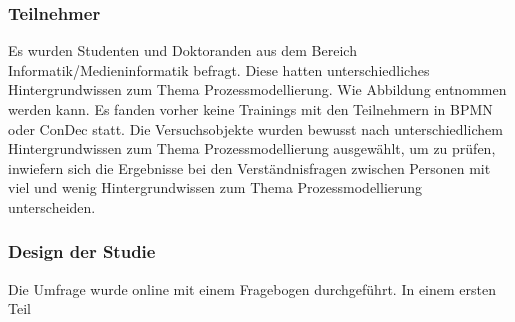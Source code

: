 \subsubsection{Teilnehmer}

Es wurden Studenten und Doktoranden aus dem Bereich Informatik/Medieninformatik befragt. Diese hatten unterschiedliches Hintergrundwissen zum Thema Prozessmodellierung. Wie Abbildung entnommen werden kann. Es fanden vorher keine Trainings mit den Teilnehmern in BPMN oder ConDec statt. Die Versuchsobjekte wurden bewusst nach unterschiedlichem Hintergrundwissen zum Thema Prozessmodellierung ausgewählt, um zu prüfen, inwiefern sich die Ergebnisse bei den Verständnisfragen zwischen Personen mit viel und wenig Hintergrundwissen zum Thema Prozessmodellierung unterscheiden.\newline


\subsubsection{Design der Studie}
Die Umfrage wurde online mit einem Fragebogen durchgeführt.
In einem ersten Teil